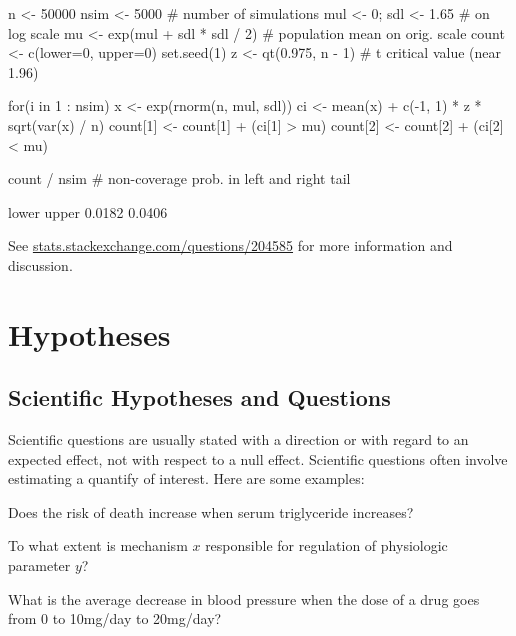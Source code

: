 \begin{Schunk}
\begin{Sinput}
n    <- 50000
nsim <- 5000            # number of simulations
mul <- 0; sdl <- 1.65   # on log scale
mu <- exp(mul + sdl * sdl / 2)   # population mean on orig. scale
count <- c(lower=0, upper=0)
set.seed(1)
z <- qt(0.975, n - 1)   # t critical value (near 1.96)

for(i in 1 : nsim) {
  x <- exp(rnorm(n, mul, sdl))
  ci <- mean(x) + c(-1, 1) * z * sqrt(var(x) / n)
  count[1] <- count[1] + (ci[1] > mu)
  count[2] <- count[2] + (ci[2] < mu)
}

count / nsim   # non-coverage prob. in left and right tail
\end{Sinput}
\begin{Soutput}
 lower  upper 
0.0182 0.0406 
\end{Soutput}
\end{Schunk}

See
\href{https://stats.stackexchange.com/questions/204585}{stats.stackexchange.com/questions/204585}
for more information and discussion.

\section{Hypotheses}
\subsection{Scientific Hypotheses and Questions}
Scientific questions are usually stated with a direction or with
regard to an expected effect, not with respect to a null effect.
Scientific questions often involve estimating a quantify of interest.
Here are some examples:
\bi
\item Does the risk of death increase when serum triglyceride
  increases?
\item To what extent is mechanism $x$ responsible for regulation of physiologic
  parameter $y$?
\item What is the average decrease in blood pressure when the dose of
  a drug goes from 0 to 10mg/day to 20mg/day?
\ei
